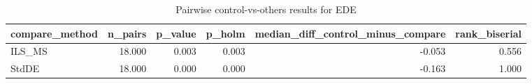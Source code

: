 \begin{table}[!t]
\centering
\caption{Pairwise control-vs-others results for EDE}
\label{tab:posthoc_holm_generated}
\begin{tabular}{lrrrrr}
\toprule
compare_method & n_pairs & p_value & p_holm & median_diff_control_minus_compare & rank_biserial \\
\midrule
ILS_MS & 18.000 & 0.003 & 0.003 & -0.053 & 0.556 \\
StdDE & 18.000 & 0.000 & 0.000 & -0.163 & 1.000 \\
\bottomrule
\end{tabular}

\end{table}